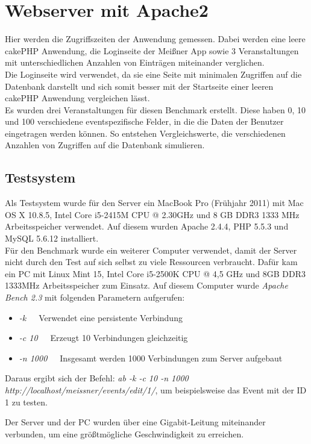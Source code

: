 \section{Webserver mit Apache2}
Hier werden die Zugriffszeiten der Anwendung gemessen. Dabei werden eine leere cakePHP Anwendung, die Loginseite der Meißner App sowie 3 Veranstaltungen mit unterschiedlichen Anzahlen von Einträgen miteinander verglichen.\\
Die Loginseite wird verwendet, da sie eine Seite mit minimalen Zugriffen auf die Datenbank darstellt und sich somit besser mit der Startseite einer leeren cakePHP Anwendung vergleichen lässt.\\
Es wurden drei Veranstaltungen für diesen Benchmark erstellt. Diese haben 0, 10 und 100 verschiedene eventspezifische Felder, in die die Daten der Benutzer eingetragen werden können. So entstehen Vergleichswerte, die verschiedenen Anzahlen von Zugriffen auf die Datenbank simulieren.

\subsection{Testsystem}
Als Testsystem wurde für den Server ein MacBook Pro (Frühjahr 2011) mit Mac OS X 10.8.5, Intel Core i5-2415M CPU @ 2.30GHz und 8 GB DDR3 1333 MHz Arbeitsspeicher verwendet. Auf diesem wurden Apache 2.4.4, PHP 5.5.3 und MySQL 5.6.12 installiert.\\
Für den Benchmark wurde ein weiterer Computer verwendet, damit der Server nicht durch den Test auf sich selbst zu viele Ressourcen verbraucht. Dafür kam ein PC mit Linux Mint 15, Intel Core i5-2500K CPU @ 4,5 GHz und 8GB DDR3 1333MHz Arbeitsspeicher zum Einsatz. Auf diesem Computer wurde \emph{Apache Bench 2.3} mit folgenden Parametern aufgerufen:

\begin{itemize}
	\item[] \emph{-k}\ \ \ Verwendet eine persistente Verbindung
	\item[] \emph{-c 10}\ \ \ Erzeugt 10 Verbindungen gleichzeitig
	\item[] \emph{-n 1000}\ \ \ Insgesamt werden 1000 Verbindungen zum Server aufgebaut
\end{itemize}

Daraus ergibt sich der Befehl: \emph{ab -k -c 10 -n 1000 http://localhost/meissner/events/edit/1/}, um beispielsweise das Event mit der ID 1 zu testen.\par

Der Server und der PC wurden über eine Gigabit-Leitung miteinander verbunden, um eine größtmögliche Geschwindigkeit zu erreichen.

